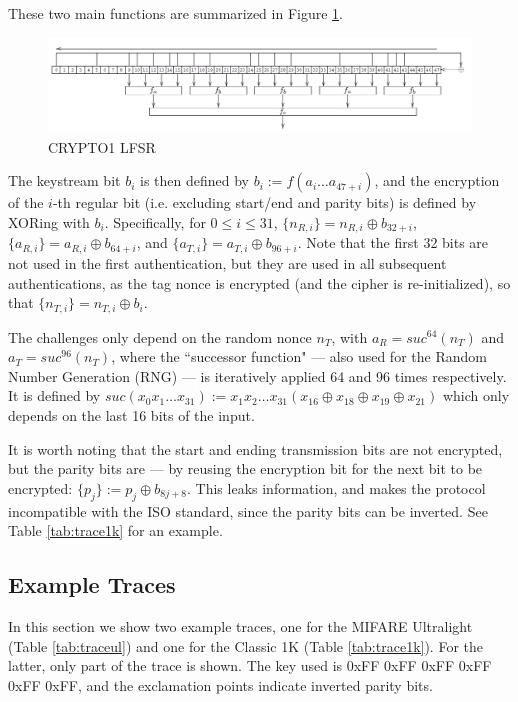 \documentclass[fleqn,10pt]{SelfArx} %
\begin{document}
These two main functions are summarized in Figure \ref{fig:lfsr}.

\begin{figure}[h]
  \hfill\includegraphics[width=\linewidth]{img/lfsr} \hspace*{\fill}
  \caption{CRYPTO1 LFSR \cite{classicvulnerabilities}}
  \label{fig:lfsr}
\end{figure}

The keystream bit $b_i$ is then defined by $b_i := f(a_i\ldots a_{47+i})$, and the encryption of the $i$-th regular bit (i.e. excluding start/end and parity bits) is defined by XORing with $b_i$. Specifically, for $0\le i \le 31$, $\{n_{R,i}\}=n_{R,i} \oplus b_{32+i}$, $\{a_{R,i}\}=a_{R,i} \oplus b_{64+i}$, and $\{a_{T,i}\}=a_{T,i} \oplus b_{96+i}$. Note that the first 32 bits are not used in the first authentication, but they are used in all subsequent authentications, as the tag nonce is encrypted (and the cipher is re-initialized), so that $\{n_{T,i}\}=n_{T,i} \oplus b_i$. 

The challenges only depend on the random nonce $n_T$, with $a_R=suc^{64}(n_T)$ and $a_T=suc^{96}(n_T)$, where the ``successor function" --- also used for the Random Number Generation (RNG) --- is iteratively applied 64 and 96 times respectively. It is defined by $suc(x_0x_1\ldots x_{31}):=x_1x_2\ldots x_{31}(x_{16}\oplus x_{18}\oplus x_{19}\oplus x_{21})$ which only depends on the last 16 bits of the input.


It is worth noting that the start and ending transmission bits are not encrypted, but the parity bits are --- by reusing the encryption bit for the next bit to be encrypted: $\{p_j\} :=p_j \oplus b_{8j +8}$. This leaks information, and makes the protocol incompatible with the ISO standard, since the parity bits can be inverted. See Table \ref{tab:trace1k} for an example.


\subsection{Example Traces}
\label{app:traces}

In this section we show two example traces, one for the MIFARE Ultralight (Table \ref{tab:traceul}) and one for the Classic 1K (Table \ref{tab:trace1k}). For the latter, only part of the trace is shown. The key used is 0xFF 0xFF 0xFF 0xFF 0xFF 0xFF, and the exclamation points indicate inverted parity bits.
\end{document}
